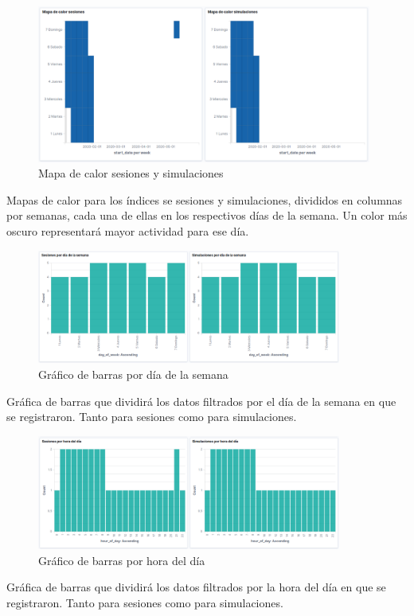 \documentclass[11pt,a4paper]{book}
\begin{document}
				
				\begin{figure}[H]
					\centering
					\includegraphics[width=11cm, keepaspectratio]{img/kibana_02_heatMap}
					\caption{Mapa de calor sesiones y simulaciones}
					\label{fig:kibana_heatmap}
				\end{figure}
				Mapas de calor para los índices se sesiones y simulaciones, divididos en columnas por semanas, cada una de ellas en los respectivos días de la semana. Un color más oscuro representará mayor actividad para ese día.\\
				
				\begin{figure}[H]
					\centering
					\includegraphics[width=10cm, keepaspectratio]{img/kibana_03_day_of_week}
					\caption{Gráfico de barras por día de la semana}
					\label{fig:kibana_dayofweek}
				\end{figure}
				Gráfica de barras que dividirá los datos filtrados por el día de la semana en que se registraron. Tanto para sesiones como para simulaciones.\\
				
				\begin{figure}[H]
					\centering
					\includegraphics[width=10cm, keepaspectratio]{img/kibana_04_hour_of_day}
					\caption{Gráfico de barras por hora del día}
					\label{fig:kibana_hourofday}
				\end{figure}
				Gráfica de barras que dividirá los datos filtrados por la hora del día en que se registraron. Tanto para sesiones como para simulaciones.\\
				
\end{document}
